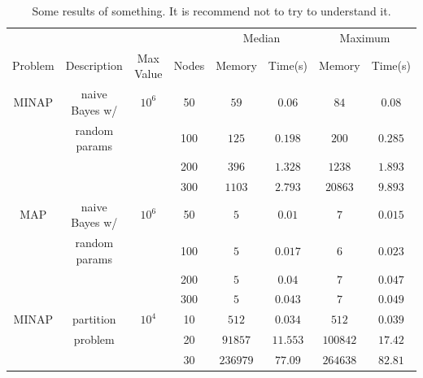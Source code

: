 \documentclass{article}
\begin{document}
\begin{table}[ht]
  \caption{Some results of something. It is recommend not to try to understand it.\label{table:somethinginside}}
  \begin{center}
    \begin{tabular}{cccc|cc|cc}
              &                &           &       & \multicolumn{2}{c|}{Median} & \multicolumn{2}{c}{Maximum}                       \\
      Problem & Description    & Max Value & Nodes & Memory                      & Time(s)                     & Memory    & Time(s) \\
      \hline
      MINAP   & naive Bayes w/ & $10^{6}$  & 50    & $59$                        & $0.06$                      & $84$      & $0.08$  \\
              & random params  &           & 100   & $125$                       & $0.198$                     & $200$     & $0.285$ \\
              &                &           & 200   & $396$                       & $1.328$                     & $1238$    & $1.893$ \\
              &                &           & 300   & $1103$                      & $2.793$                     & $20863$   & $9.893$ \\
      MAP     & naive Bayes w/ & $10^{6}$  & 50    & $5$                         & $0.01$                      & $7$       & $0.015$ \\
              & random params  &           & 100   & $5$                         & $0.017$                     & $6$       & $0.023$ \\
              &                &           & 200   & $5$                         & $0.04$                      & $7$       & $0.047$ \\
              &                &           & 300   & $5$                         & $0.043$                     & $7$       & $0.049$ \\
      MINAP   & partition      & $10^{4}$  & 10    & $512$                       & $0.034$                     & $512$     & $0.039$ \\
              & problem        &           & 20    & $91857$                     & $11.553$                    & $100842$  & $17.42$ \\
              &                &           & 30    & $236979$                    & $77.09$                     & $264638$  & $82.81$ \\

\end{tabular}
\end{center}
\end{table}
\end{document}

